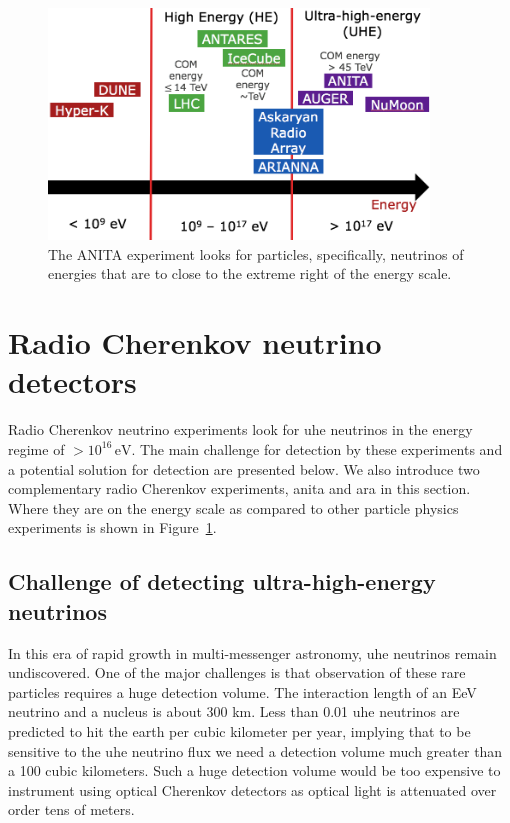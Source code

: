 \begin{figure}
\centering
\includegraphics[width=0.9\textwidth]{figures/anita_where_energy.png}
\caption{The ANITA experiment looks for particles, specifically, neutrinos of energies that are to close to the extreme right of the energy scale.}
\label{anita_energy}
\end{figure}


\section{Radio Cherenkov neutrino detectors}

Radio Cherenkov neutrino experiments look for \gls{uhe} neutrinos in the energy regime of $> 10^{16}\,\mathrm{eV}$. The main challenge for detection by these experiments and a potential solution for detection are presented below. We also introduce two complementary radio Cherenkov experiments, \gls{anita} and \gls{ara} in this section. Where they are on the energy scale as compared to other particle physics experiments is shown in Figure~\ref{anita_energy}.

\subsection{Challenge of detecting ultra-high-energy neutrinos}

In this era of rapid growth in multi-messenger astronomy, \gls{uhe} neutrinos remain undiscovered. One of the major challenges is that observation of these rare particles requires a huge detection volume. The interaction length of an EeV neutrino and a nucleus is about 300 km. Less than 0.01 \gls{uhe} neutrinos are predicted to hit the earth per cubic kilometer per year, implying that to be sensitive to the \gls{uhe} neutrino flux we need a detection volume much greater than a 100 cubic kilometers. Such a huge detection volume would be too expensive to instrument using optical Cherenkov detectors as optical light is attenuated over order tens of meters.


